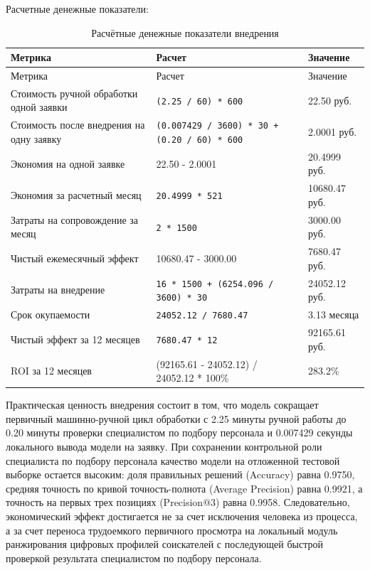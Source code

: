 Расчетные денежные показатели:

\begin{small}
\begin{longtable}{|P{0.30\textwidth}|P{0.34\textwidth}|P{0.28\textwidth}|}
\caption{Расчётные денежные показатели внедрения}\label{tbl:roi}\\
\hline
Метрика & Расчет & Значение \\
\hline
\endfirsthead
\hline
Метрика & Расчет & Значение \\
\hline
\endhead
\hline
\endfoot
\hline
\endlastfoot
Стоимость ручной обработки одной заявки & \texttt{(2.25 / 60) * 600} & 22.50 руб. \\
\hline
Стоимость после внедрения на одну заявку & \texttt{(0.007429 / 3600) * 30 + (0.20 / 60) * 600} & 2.0001 руб. \\
\hline
Экономия на одной заявке & 22.50 - 2.0001 & 20.4999 руб. \\
\hline
Экономия за расчетный месяц & \texttt{20.4999 * 521} & 10680.47 руб. \\
\hline
Затраты на сопровождение за месяц & \texttt{2 * 1500} & 3000.00 руб. \\
\hline
Чистый ежемесячный эффект & 10680.47 - 3000.00 & 7680.47 руб. \\
\hline
Затраты на внедрение & \texttt{16 * 1500 + (6254.096 / 3600) * 30} & 24052.12 руб. \\
\hline
Срок окупаемости & \texttt{24052.12 / 7680.47} & 3.13 месяца \\
\hline
Чистый эффект за 12 месяцев & \texttt{7680.47 * 12} & 92165.61 руб. \\
\hline
ROI за 12 месяцев & (92165.61 - 24052.12) / 24052.12 * 100\% & 283.2\% \\
\end{longtable}
\end{small}

Практическая ценность внедрения состоит в том, что модель сокращает первичный машинно-ручной цикл обработки с 2.25 минуты ручной работы до 0.20 минуты проверки специалистом по подбору персонала и 0.007429 секунды локального вывода модели на заявку. При сохранении контрольной роли специалиста по подбору персонала качество модели на отложенной тестовой выборке остается высоким: доля правильных решений (Accuracy) равна 0.9750, средняя точность по кривой точность-полнота (Average Precision) равна 0.9921, а точность на первых трех позициях (Precision@3) равна 0.9958. Следовательно, экономический эффект достигается не за счет исключения человека из процесса, а за счет переноса трудоемкого первичного просмотра на локальный модуль ранжирования цифровых профилей соискателей с последующей быстрой проверкой результата специалистом по подбору персонала.

